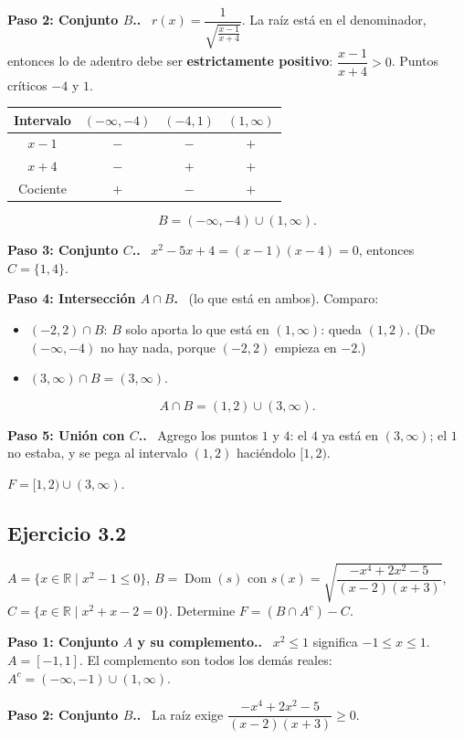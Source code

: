 \documentclass[11pt,a4paper]{article}
\newcommand{\R}{\mathbb{R}}
\newcommand{\dom}{\operatorname{Dom}}
\newcommand{\paso}[1]{\par\medskip\noindent\textbf{\textcolor{blue!50!black}{Paso #1.}}\ }
\begin{document}
\paso{2: Conjunto $B$.} $r(x)=\dfrac1{\sqrt{\frac{x-1}{x+4}}}$. La raíz está en el denominador, entonces lo de adentro debe ser \textbf{estrictamente positivo}:
$\dfrac{x-1}{x+4}>0$. Puntos críticos $-4$ y $1$.
\begin{center}
\begin{tabular}{c|ccc}
Intervalo & $(-\infty,-4)$ & $(-4,1)$ & $(1,\infty)$\\ \hline
$x-1$ & $-$ & $-$ & $+$\\
$x+4$ & $-$ & $+$ & $+$\\ \hline
Cociente & $+$ & $-$ & $+$
\end{tabular}
\end{center}
\[ B=(-\infty,-4)\cup(1,\infty). \]

\paso{3: Conjunto $C$.} $x^2-5x+4=(x-1)(x-4)=0$, entonces $C=\{1,4\}$.

\paso{4: Intersección $A\cap B$} (lo que está en ambos). Comparo:
\begin{itemize}[nosep]
  \item $(-2,2)\cap B$: $B$ solo aporta lo que está en $(1,\infty)$: queda $(1,2)$. (De $(-\infty,-4)$ no hay nada, porque $(-2,2)$ empieza en $-2$.)
  \item $(3,\infty)\cap B=(3,\infty)$.
\end{itemize}
\[ A\cap B=(1,2)\cup(3,\infty). \]

\paso{5: Unión con $C$.} Agrego los puntos $1$ y $4$: el $4$ ya está en $(3,\infty)$; el $1$ no estaba, y se pega al intervalo $(1,2)$ haciéndolo $[1,2)$.
\begin{respuesta}
$F=[1,2)\cup(3,\infty).$
\end{respuesta}

\subsection{Ejercicio 3.2}
\begin{enunciado}
$A=\{x\in\R\mid x^2-1\le0\}$, \quad
$B=\dom(s)$ con $s(x)=\sqrt{\dfrac{-x^4+2x^2-5}{(x-2)(x+3)}}$, \quad
$C=\{x\in\R\mid x^2+x-2=0\}$. Determine $F=(B\cap A^c)-C$.
\end{enunciado}

\paso{1: Conjunto $A$ y su complemento.} $x^2\le1$ significa $-1\le x\le1$. $A=[-1,1]$.
El complemento son todos los demás reales: $A^c=(-\infty,-1)\cup(1,\infty)$.

\paso{2: Conjunto $B$.} La raíz exige $\dfrac{-x^4+2x^2-5}{(x-2)(x+3)}\ge0$.
\end{document}
